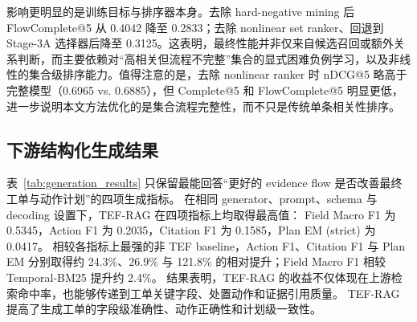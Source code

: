 影响更明显的是训练目标与排序器本身。去除 hard-negative mining 后 FlowComplete@5 从 0.4042 降至 0.2833；去除 nonlinear set ranker、回退到 Stage-3A 选择器后降至 0.3125。这表明，最终性能并非仅来自候选召回或额外关系判断，而主要依赖对“高相关但流程不完整”集合的显式困难负例学习，以及非线性的集合级排序能力。值得注意的是，去除 nonlinear ranker 时 nDCG@5 略高于完整模型（0.6965 vs. 0.6885），但 Complete@5 和 FlowComplete@5 明显更低，进一步说明本文方法优化的是集合流程完整性，而不只是传统单条相关性排序。

\begin{table}[t]
\caption{Validation split 上的 TEF-RAG 消融结果}
\label{tab:ablation_results}
\centering
\small
\setlength{\tabcolsep}{3pt}
\end{table}

\subsection{下游结构化生成结果}
\label{sec:generation_results}

表~\ref{tab:generation_results} 只保留最能回答“更好的 evidence flow 是否改善最终工单与动作计划”的四项生成指标。
在相同 generator、prompt、schema 与 decoding 设置下，TEF-RAG 在四项指标上均取得最高值：
Field Macro F1 为 0.5345，Action F1 为 0.2035，Citation F1 为 0.1585，Plan EM (strict) 为 0.0417。
相较各指标上最强的非 TEF baseline，Action F1、Citation F1 与 Plan EM 分别取得约 24.3\%、26.9\% 与 121.8\% 的相对提升；Field Macro F1 相较 Temporal-BM25 提升约 2.4\%。
结果表明，TEF-RAG 的收益不仅体现在上游检索命中率，也能够传递到工单关键字段、处置动作和证据引用质量。
TEF-RAG 提高了生成工单的字段级准确性、动作正确性和计划级一致性。

